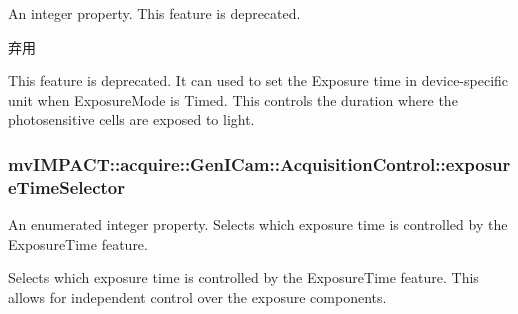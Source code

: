 An integer property. This feature is deprecated. 

\begin{DoxyRefDesc}{弃用}
\item[\hyperlink{deprecated__deprecated000046}{弃用}]This feature is deprecated. It can used to set the Exposure time in device-\/specific unit when Exposure\+Mode is Timed. This controls the duration where the photosensitive cells are exposed to light. \end{DoxyRefDesc}
\hypertarget{classmv_i_m_p_a_c_t_1_1acquire_1_1_gen_i_cam_1_1_acquisition_control_a2c75217c0225d5c95c88c1dcea7ed2a4}{
\subsubsection[{exposure\+Time\+Selector}]{ mv\+I\+M\+P\+A\+C\+T\+::acquire\+::\+Gen\+I\+Cam\+::\+Acquisition\+Control\+::exposure\+Time\+Selector}}\label{classmv_i_m_p_a_c_t_1_1acquire_1_1_gen_i_cam_1_1_acquisition_control_a2c75217c0225d5c95c88c1dcea7ed2a4}


An enumerated integer property. Selects which exposure time is controlled by the Exposure\+Time feature. 

Selects which exposure time is controlled by the Exposure\+Time feature. This allows for independent control over the exposure components.

